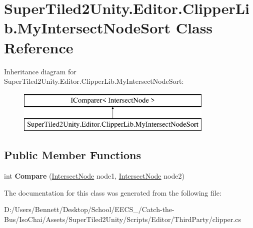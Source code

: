 \hypertarget{class_super_tiled2_unity_1_1_editor_1_1_clipper_lib_1_1_my_intersect_node_sort}{}\section{Super\+Tiled2\+Unity.\+Editor.\+Clipper\+Lib.\+My\+Intersect\+Node\+Sort Class Reference}
\label{class_super_tiled2_unity_1_1_editor_1_1_clipper_lib_1_1_my_intersect_node_sort}
Inheritance diagram for Super\+Tiled2\+Unity.\+Editor.\+Clipper\+Lib.\+My\+Intersect\+Node\+Sort\+:\begin{figure}[H]
\begin{center}
\leavevmode
\includegraphics[height=2.000000cm]{class_super_tiled2_unity_1_1_editor_1_1_clipper_lib_1_1_my_intersect_node_sort}
\end{center}
\end{figure}
\subsection*{Public Member Functions}
\begin{DoxyCompactItemize}
\item 
\mbox{\label{class_super_tiled2_unity_1_1_editor_1_1_clipper_lib_1_1_my_intersect_node_sort_add02938c0e4a0fa7a508161d0d7747a1}} 
int {\bfseries Compare} (\mbox{\hyperlink{class_super_tiled2_unity_1_1_editor_1_1_clipper_lib_1_1_intersect_node}{Intersect\+Node}} node1, \mbox{\hyperlink{class_super_tiled2_unity_1_1_editor_1_1_clipper_lib_1_1_intersect_node}{Intersect\+Node}} node2)
\end{DoxyCompactItemize}


The documentation for this class was generated from the following file\+:\begin{DoxyCompactItemize}
\item 
D\+:/\+Users/\+Bennett/\+Desktop/\+School/\+E\+E\+C\+S\+\_/\+Catch-\/the-\/\+Bus/\+Iso\+Chai/\+Assets/\+Super\+Tiled2\+Unity/\+Scripts/\+Editor/\+Third\+Party/clipper.\+cs\end{DoxyCompactItemize}

